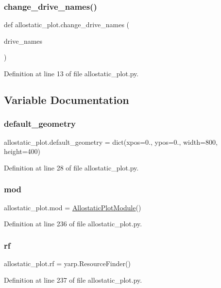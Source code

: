 \subsubsection{\texorpdfstring{change\+\_\+drive\+\_\+names()}{change\_drive\_names()}}
{\footnotesize\ttfamily def allostatic\+\_\+plot.\+change\+\_\+drive\+\_\+names (\begin{DoxyParamCaption}\item[{}]{drive\+\_\+names }\end{DoxyParamCaption})}



Definition at line 13 of file allostatic\+\_\+plot.\+py.



\subsection{Variable Documentation}
\mbox{\label{namespaceallostatic__plot_a7f3371fbe10435cee932dcc577aaf142}} 
\subsubsection{\texorpdfstring{default\+\_\+geometry}{default\_geometry}}
{\footnotesize\ttfamily allostatic\+\_\+plot.\+default\+\_\+geometry = dict(xpos=0., ypos=0., width=800, height=400)}



Definition at line 28 of file allostatic\+\_\+plot.\+py.

\mbox{\label{namespaceallostatic__plot_a57762a93ed3c99265f85f859d1c86cf6}} 
\subsubsection{\texorpdfstring{mod}{mod}}
{\footnotesize\ttfamily allostatic\+\_\+plot.\+mod = \hyperlink{classallostatic__plot_1_1AllostaticPlotModule}{Allostatic\+Plot\+Module}()}



Definition at line 236 of file allostatic\+\_\+plot.\+py.

\mbox{\label{namespaceallostatic__plot_a4b1d388f7cddaea7d81cf5c088c3a441}} 
\subsubsection{\texorpdfstring{rf}{rf}}
{\footnotesize\ttfamily allostatic\+\_\+plot.\+rf = yarp.\+Resource\+Finder()}



Definition at line 237 of file allostatic\+\_\+plot.\+py.

